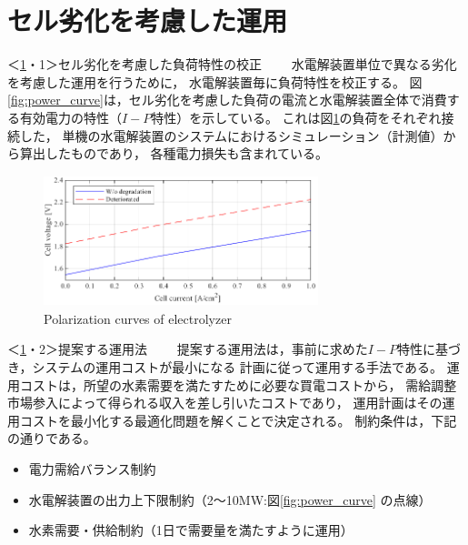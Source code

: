 \documentclass[fleqn]{ieej}
\begin{document}
\vspace{-2mm}

\section{セル劣化を考慮した運用}\label{sec:proposed_method}

\vspace{-2mm}

＜\ref{sec:proposed_method}・1＞セル劣化を考慮した負荷特性の校正　　
水電解装置単位で異なる劣化を考慮した運用を行うために，
水電解装置毎に負荷特性を校正する。
図\ref{fig:power_curve}は，セル劣化を考慮した負荷の電流と水電解装置全体で消費する有効電力の特性（$I-P$特性）を示している。
これは図\ref{fig:Polarization}の負荷をそれぞれ接続した，
単機の水電解装置のシステム\cite{Nakamura_2023}におけるシミュレーション（計測値）から算出したものであり，
各種電力損失も含まれている。

\begin{figure}[b]%
  \begin{center}
  \setlength{\abovecaptionskip}{0mm} %
  \setlength{\belowcaptionskip}{0mm} %
  \includegraphics[width=8cm,height=3.8cm]{Polarization_curves.pdf}  
  \caption{Polarization curves of electrolyzer}\label{fig:Polarization}   
  \end{center}
\end{figure}


＜\ref{sec:proposed_method}・2＞提案する運用法　　
提案する運用法は，事前に求めた$I-P$特性に基づき，システムの運用コストが最小になる%
計画に従って運用する手法である。
運用コストは，所望の水素需要を満たすために必要な買電コストから，
需給調整市場参入によって得られる収入を差し引いたコストであり，
運用計画はその運用コストを最小化する最適化問題を解くことで決定される。
制約条件は，下記の通りである。
\begin{itemize}
  \item 電力需給バランス制約        
  \item 水電解装置の出力上下限制約（2～10MW:図\ref{fig:power_curve} の点線）
  \item 水素需要・供給制約（1日で需要量を満たすように運用）
\end{itemize}
\end{document}
